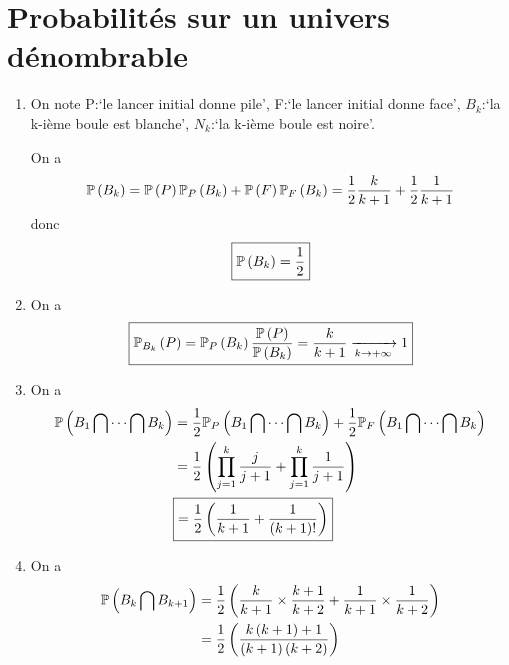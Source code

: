 \section{Probabilités sur un univers dénombrable}

\begin{solution}
    \phantom{}
    \begin{enumerate}
        \item On note P:`le lancer initial donne pile', F:`le lancer initial donne face', $B_{k}$:`la k-ième boule est blanche', $N_{k}$:`la k-ième boule est noire'.
        
        On a 
        \begin{equation}
            \P\left(B_{k}\right)=\P\left(P\right)\P_{P}\left(B_{k}\right)+\P\left(F\right)\P_{F}\left(B_{k}\right)=\frac{1}{2}\frac{k}{k+1}+\frac{1}{2}\frac{1}{k+1}
        \end{equation}
        donc 
        \begin{equation}
            \boxed{\P\left(B_{k}\right)=\frac{1}{2}}
        \end{equation}

        \item On a 
        \begin{equation}
            \boxed{\P_{B_{k}}\left(P\right)=\P_{P}\left(B_{k}\right)\frac{\P\left(P\right)}{\P\left(B_{k}\right)}=\frac{k}{k+1}\xrightarrow[k\to+\infty]{}1}
        \end{equation}

        \item On a 
        \begin{align}
            \P\left(B_{1}\bigcap\dots\bigcap B_{k}\right)
            &=\frac{1}{2}\P_{P}\left(B_{1}\bigcap\dots\bigcap B_{k}\right)+\frac{1}{2}\P_{F}\left(B_{1}\bigcap\dots\bigcap B_{k}\right)\\
            &=\frac{1}{2}\left(\prod_{j=1}^{k}\frac{j}{j+1}+\prod_{j=1}^{k}\frac{1}{j+1}\right)\\
            &\boxed{=\frac{1}{2}\left(\frac{1}{k+1}+\frac{1}{(k+1)!}\right)}
        \end{align}

        \item On a 
        \begin{align}
            \P\left(B_{k}\bigcap B_{k+1}\right)
            &=\frac{1}{2}\left(\frac{k}{k+1}\times\frac{k+1}{k+2}+\frac{1}{k+1}\times\frac{1}{k+2}\right)\\
            &=\frac{1}{2}\left(\frac{k\left(k+1\right)+1}{\left(k+1\right)\left(k+2\right)}\right)
        \end{align}


\end{enumerate}
\end{solution}
